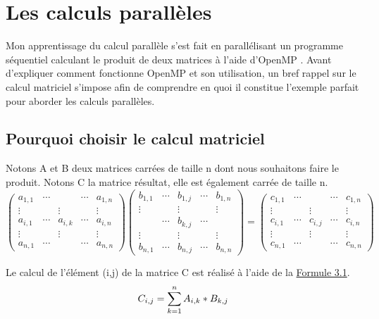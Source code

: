 \chapter{Les calculs parallèles}

Mon apprentissage du calcul parallèle s'est fait en parallélisant un programme séquentiel calculant le produit de deux matrices à l'aide d'OpenMP \cite{ref1}. Avant d'expliquer comment fonctionne OpenMP et son utilisation, un bref rappel sur le calcul matriciel s'impose afin de comprendre en quoi il constitue l'exemple parfait pour aborder les calculs parallèles. 

\section{Pourquoi choisir le calcul matriciel}
Notons A et B deux matrices carrées de taille n dont nous souhaitons faire le produit. Notons C la matrice résultat, elle est également carrée de taille n. 
\begin{equation*}
\begin{pmatrix}
	a_{1,1} & \cdots & & \cdots & a_{1,n} \\
	\vdots & & \vdots & &\vdots \\
	a_{i,1} & \cdots & a_{i,k} & \cdots & a_{i,n} \\
	\vdots & & \vdots & & \vdots \\
	a_{n,1} & \cdots & & \cdots & a_{n,n} 
\end{pmatrix} 
\begin{pmatrix}
	b_{1,1} & \cdots & b_{1,j} & \cdots & b_{1,n} \\
	\vdots & & \vdots & &\vdots \\
	  & \cdots & b_{k,j} & \cdots &   \\
	\vdots & & \vdots & & \vdots \\
	b_{n,1} & \cdots & b_{n,j} & \cdots & b_{n,n} 
\end{pmatrix}
=
\begin{pmatrix}
	c_{1,1} & \cdots & & \cdots & c_{1,n} \\
	\vdots & & \vdots & &\vdots \\
	c_{i,1} & \cdots & c_{i,j} & \cdots & c_{i,n} \\
	\vdots & & \vdots & & \vdots \\
	c_{n,1} & \cdots & & \cdots & c_{n,n} 
\end{pmatrix}
\end{equation*}

Le calcul de l'élément (i,j) de la matrice C est réalisé à l'aide de la \hyperref[formule:3.1]{Formule 3.1}.
\begin{equation}
\large{C_{i,j} = \sum_{k=1}^{n} A_{i,k}*B_{k,j}} \label{formule:3.1}
\end{equation}

